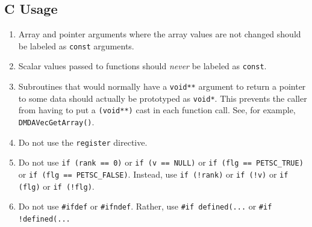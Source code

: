 \subsection{C Usage}
\begin{enumerate}
\item Array and pointer arguments where the array values are not changed should be labeled as \lstinline{const} arguments.
\item Scalar values passed to functions should {\em never} be labeled as \lstinline{const}.
\item Subroutines that would normally have a \lstinline{void**} argument to return a pointer to some data should
actually be prototyped as \lstinline{void*}. This prevents the caller from having to put a \lstinline{(void**)} cast in each function call. See, for example, \lstinline{DMDAVecGetArray()}.
\item Do not use the \lstinline{register} directive.
\item Do not use \lstinline{if (rank == 0)} or \lstinline{if (v == NULL)} or \lstinline{if (flg == PETSC_TRUE)} or \lstinline{if (flg == PETSC_FALSE)}.
Instead, use \lstinline{if (!rank)} or \lstinline{if (!v)} or \lstinline{if (flg)} or \lstinline{if (!flg)}.
\item Do not use \lstinline{#ifdef} or \lstinline{#ifndef}. Rather, use \lstinline{#if defined(...} or \lstinline{#if !defined(...}
\end{enumerate}

